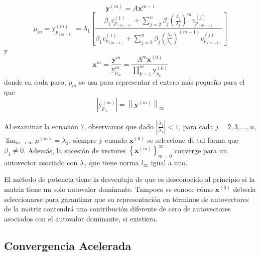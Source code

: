 \documentclass{report}
\numberwithin{subsection}{section} %
\begin{document}
\begin{equation*}
\textbf{y}^{\left( m \right)} = A \textbf{x}^{m-1}
\end{equation*}
\begin{equation}
\mu_{m} = \text{y}_{p_{\left( m-1 \right)}}^{\left( m \right)} = \lambda_{1} \left[ \frac{\beta_{1} v_{p_{\left( m-1 \right)}}^{\left( 1 \right)} + \sum_{j = 2}^{n} \beta_{j} \left( \frac{\lambda_{j}}{\lambda_{1}} \right)^{m} v_{p_{\left( m-1 \right)}}^{\left( j \right)}}{\beta_{1}  v_{p_{\left( m-1 \right)}}^{\left( 1 \right)} + \sum_{j = 2}^{n} \beta_{j} \left( \frac{\lambda_{j}}{\lambda_{1}} \right)^{\left( m-1 \right)} v_{p_{\left( m-1 \right)}}^{\left( j \right)}} \right]
\end{equation}
y
\begin{equation*}
\textbf{x}^{m} = \frac{\textbf{y}^{m}}{\text{y}_{p_{m}}^{m}} = \frac{A^{m}\textbf{x}^{\left( 0 \right)}}{\prod_{k=1}^{m}\text{y}_{p_{k}}^{\left( k \right)}}
\end{equation*}
donde en cada paso, $p_{m}$ se usa para representar el entero más pequeño para el que
\begin{equation*}
\left| \text{y}_{p_{m}}^{\left( m \right)} \right| = \left\| \textbf{y}^{\left( m \right)} \right\|_{\infty }
\end{equation*}

Al examinar la ecuación 7, observamos que dado $\left| \frac{\lambda_{j}}{\lambda_{1}} \right| < 1$, para cada $j = 2, 3, ..., n$, $\lim_{m \to \infty } \mu^{\left( m \right)} = \lambda_{1}$, siempre y cuando $\textbf{x}^{\left( 0 \right)}$ se seleccione de tal forma que $\beta_{1} \neq 0$. Además, la sucesión de vectores $\left\{ \textbf{x}^{\left( m \right)} \right\}_{m = 0}^{\infty }$ converge para un autovector asociado con $\lambda_{1}$ que tiene norma $l_{\infty}$ igual a uno.

El método de potencia tiene la desventaja de que es desconocido al principio si la matriz tiene un solo autovalor dominante. Tampoco se conoce cómo $\textbf{x}^{\left( 0 \right)}$ debería seleccionarse para garantizar que su representación en términos de autovectores de la matriz contendrá una contribución diferente de cero de autovectores asociados con el autovalor dominante, si existiera.


\subsection{\textnormal{Convergencia Acelerada}}
\end{document}
